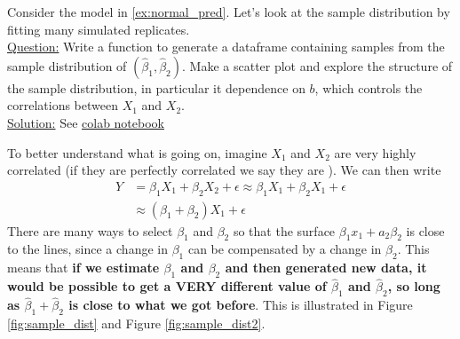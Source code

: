 \begin{itemize}
\begin{example}

Consider the model in \ref{ex:normal_pred}. Let's look at the sample distribution by fitting many simulated replicates. \\

\noindent
\underline{Question:} Write a function to generate a dataframe containing samples from the sample distribution of $(\hat{\beta}_1,\hat{\beta}_2)$. Make a scatter plot and explore the structure of the sample distribution, in particular it dependence on $b$, which controls the correlations between $X_1$ and $X_2$. \\


\noindent
\underline{Solution:} 
See \href{https://colab.research.google.com/drive/1oIRgP_7-c5DGV1D2iz5nj406mZfJxUIG?usp=sharing}{colab notebook}

\end{example}

To better understand what is going on, imagine $X_1$ and $X_2$ are very highly correlated (if they are perfectly correlated we say they are ). We can then write 
\begin{align*}
Y &= \beta_1X_1 + \beta_2X_2 + \epsilon  \approx \beta_1X_1 + \beta_2X_1 + \epsilon\\
 &\approx (\beta_1+\beta_2)X_1 + \epsilon
\end{align*}
There are many ways to select $\beta_1$ and $\beta_2$ so that the surface $\beta_1x_1+a_2\beta_2$ is close to the lines, since a change in $\beta_1$ can be compensated by a change in $\beta_2$. This means that {\bf if we estimate $\beta_1$ and $\beta_2$ and then generated new data, it would be possible to get a VERY different value of $\hat{\beta}_1$ and $\hat{\beta}_2$, so long as $\hat{\beta}_1 + \hat{\beta}_2$ is close to what we got before}. This is illustrated in Figure \ref{fig:sample_dist} and Figure \ref{fig:sample_dist2}. 


\end{itemize}
